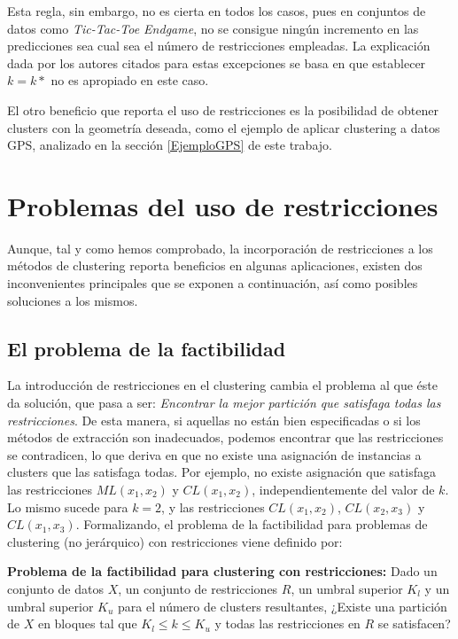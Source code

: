 Esta regla, sin embargo, no es cierta en todos los casos, pues en conjuntos de datos como \textit{Tic-Tac-Toe Endgame}, no se consigue ningún incremento en las predicciones sea cual sea el número de restricciones empleadas. La explicación dada por los autores citados para estas excepciones se basa en que establecer $k = k*$ no es apropiado en este caso.

El otro beneficio que reporta el uso de restricciones es la posibilidad de obtener clusters con la geometría deseada, como el ejemplo de aplicar clustering a datos \acs{GPS}, analizado en la sección \ref{EjemploGPS} de este trabajo.

\section{Problemas del uso de restricciones} \label{Problemas}

Aunque, tal y como hemos comprobado, la incorporación de restricciones a los métodos de clustering reporta beneficios en algunas aplicaciones, existen dos inconvenientes principales que se exponen a continuación, así como posibles soluciones a los mismos.

\subsection{El problema de la factibilidad}

La introducción de restricciones en el clustering cambia el problema al que éste da solución, que pasa a ser: \textit{Encontrar la mejor partición que satisfaga todas las restricciones}. De esta manera, si aquellas no están bien especificadas o si los métodos de extracción son inadecuados, podemos encontrar que las restricciones se contradicen, lo que deriva en que no existe una asignación de instancias a clusters que las satisfaga todas. Por ejemplo, no existe asignación que satisfaga las restricciones $ML(x_1,x_2)$ y $CL(x_1,x_2)$, independientemente del valor de $k$. Lo mismo sucede para $k = 2$, y las restricciones $CL(x_1, x_2)$, $CL(x_2, x_3)$ y $CL(x_1, x_3)$. Formalizando, el problema de la factibilidad para problemas de clustering (no jerárquico) con restricciones viene definido por:

\begin{definicion}
	
	\textbf{Problema de la factibilidad para clustering con restricciones:} Dado un conjunto de datos $X$, un conjunto de restricciones $R$, un umbral superior $K_l$ y un umbral superior $K_u$ para el número de clusters resultantes, ¿Existe una partición de $X$ en bloques tal que $K_l \le k \le K_u$ y todas las restricciones en $R$ se satisfacen? \cite{DavidsonRavi:2005a} \cite{Survey:2007}
	
\end{definicion}

